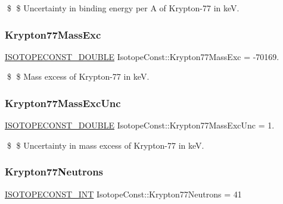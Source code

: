 \$ \$ Uncertainty in binding energy per A of Krypton-\/77 in keV. \mbox{\label{group___isotope_const-_krypton-_kr77_gad56c8cf96fbe6c5160c9358984873301}} 
\subsubsection{\texorpdfstring{Krypton77\+Mass\+Exc}{Krypton77MassExc}}
{\footnotesize\ttfamily \mbox{\hyperlink{group___isotope_const-_macros_ga8f45a7272ce02c0b4c65c44636ed719a}{I\+S\+O\+T\+O\+P\+E\+C\+O\+N\+S\+T\+\_\+\+D\+O\+U\+B\+LE}} Isotope\+Const\+::\+Krypton77\+Mass\+Exc = -\/70169.}

\$ \$ Mass excess of Krypton-\/77 in keV. \mbox{\label{group___isotope_const-_krypton-_kr77_ga27648f9b2e2cd17970e1f19f67c9961c}} 
\subsubsection{\texorpdfstring{Krypton77\+Mass\+Exc\+Unc}{Krypton77MassExcUnc}}
{\footnotesize\ttfamily \mbox{\hyperlink{group___isotope_const-_macros_ga8f45a7272ce02c0b4c65c44636ed719a}{I\+S\+O\+T\+O\+P\+E\+C\+O\+N\+S\+T\+\_\+\+D\+O\+U\+B\+LE}} Isotope\+Const\+::\+Krypton77\+Mass\+Exc\+Unc = 1.}

\$ \$ Uncertainty in mass excess of Krypton-\/77 in keV. \mbox{\label{group___isotope_const-_krypton-_kr77_ga4fa99838ecee0753b62b89a12bf069a7}} 
\subsubsection{\texorpdfstring{Krypton77\+Neutrons}{Krypton77Neutrons}}
{\footnotesize\ttfamily \mbox{\hyperlink{group___isotope_const-_macros_ga5f18360b3e99483a35c32d789e62621c}{I\+S\+O\+T\+O\+P\+E\+C\+O\+N\+S\+T\+\_\+\+I\+NT}} Isotope\+Const\+::\+Krypton77\+Neutrons = 41}

